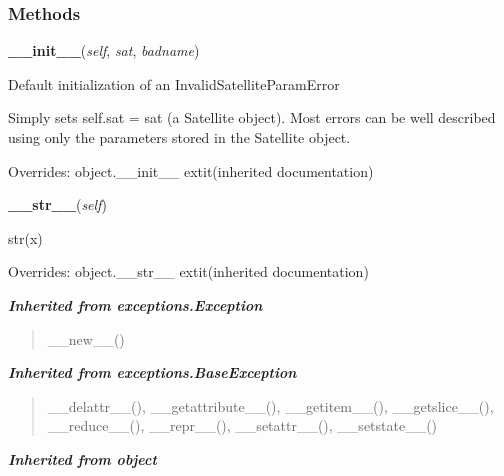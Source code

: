   \subsubsection{Methods}

    \vspace{0.5ex}

\hspace{.8\funcindent}\begin{boxedminipage}{\funcwidth}

    \raggedright \textbf{\_\_init\_\_}(\textit{self}, \textit{sat}, \textit{badname})

\setlength{\parskip}{2ex}
    Default initialization of an InvalidSatelliteParamError

    Simply sets self.sat = sat (a Satellite object).  Most errors can be 
    well described using only the parameters stored in the Satellite 
    object.

\setlength{\parskip}{1ex}
      Overrides: object.\_\_init\_\_ 	extit{(inherited documentation)}

    \end{boxedminipage}

    \vspace{0.5ex}

\hspace{.8\funcindent}\begin{boxedminipage}{\funcwidth}

    \raggedright \textbf{\_\_str\_\_}(\textit{self})

\setlength{\parskip}{2ex}
    str(x)

\setlength{\parskip}{1ex}
      Overrides: object.\_\_str\_\_ 	extit{(inherited documentation)}

    \end{boxedminipage}


\large{\textbf{\textit{Inherited from exceptions.Exception}}}

\begin{quote}
\_\_new\_\_()
\end{quote}

\large{\textbf{\textit{Inherited from exceptions.BaseException}}}

\begin{quote}
\_\_delattr\_\_(), \_\_getattribute\_\_(), \_\_getitem\_\_(), \_\_getslice\_\_(), \_\_reduce\_\_(), \_\_repr\_\_(), \_\_setattr\_\_(), \_\_setstate\_\_()
\end{quote}

\large{\textbf{\textit{Inherited from object}}}

